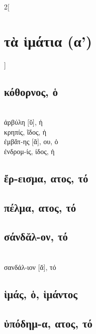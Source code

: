\documentclass{book}
\begin{document}
\begin{multicols}{2}[\section{τὰ ἱμάτια (α')}]
\subsection{κόθορνος, ὁ}               ~\\
ἀρβύλη [ῠ], ἡ  ~\\
κρηπίς, ῖδος, ἡ  ~\\
ἐμβᾰτ-ης [ᾰ], ου, ὁ  ~\\
ἐνδρομ-ίς, ίδος, ἡ 
\subsection{ἔρ-εισμα, ατος, τό} 
\subsection{πέλμα, ατος, τό}         
\subsection{σάνδᾰλ-ον, τό}              ~\\
σανδάλ-ιον [ᾰ], τό 
\subsection{ἱμάς, ὁ, ἱμάντος}  
\subsection{ὑπόδημ-α, ατος, τό}
~
\end{multicols}
\newpage
\end{document}
